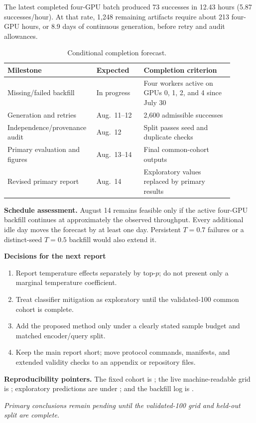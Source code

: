 \documentclass[10pt,a4paper]{article}
\begin{document}
The latest completed four-GPU batch produced 73 successes in 12.43 hours
(5.87 successes/hour). At that rate, 1,248 remaining artifacts require about
213 four-GPU hours, or 8.9 days of continuous generation, before retry and
audit allowances.

\begin{table}[h]
\centering
\small
\caption{Conditional completion forecast.}
\begin{tabular}{p{0.32\linewidth}p{0.20\linewidth}p{0.38\linewidth}}
\toprule
Milestone & Expected & Completion criterion \\
\midrule
Missing/failed backfill & In progress & Four workers active on GPUs
0, 1, 2, and 4 since July 30 \\
Generation and retries & Aug.\ 11--12 & 2,600 admissible successes \\
Independence/provenance audit & Aug.\ 12 & Split passes seed and duplicate checks \\
Primary evaluation and figures & Aug.\ 13--14 & Final common-cohort outputs \\
Revised primary report & Aug.\ 14 & Exploratory values replaced by primary results \\
\bottomrule
\end{tabular}
\end{table}

\textbf{Schedule assessment.}
August 14 remains feasible only if the active four-GPU backfill continues at
approximately the observed throughput. Every
additional idle day moves the forecast by at least one day. Persistent
$T=0.7$ failures or a distinct-seed $T=0.5$ backfill would also extend it.

\textbf{Decisions for the next report}

\begin{enumerate}
  \item Report temperature effects separately by top-$p$; do not present only
        a marginal temperature coefficient.
  \item Treat classifier mitigation as exploratory until the validated-100
        common cohort is complete.
  \item Add the proposed method only under a clearly stated sample budget and
        matched encoder/query split.
  \item Keep the main report short; move protocol commands, manifests, and
        extended validity checks to an appendix or repository files.
\end{enumerate}

\textbf{Reproducibility pointers.}
The fixed cohort is
; the live machine-readable
grid is ; exploratory predictions
are under ; and the backfill log is
.

\vfill
\begin{center}
\textit{Primary conclusions remain pending until the validated-100 grid and
held-out split are complete.}
\end{center}
\end{document}
